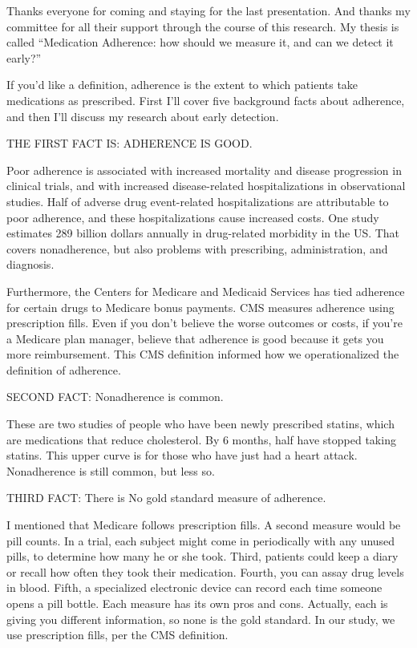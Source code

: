\documentclass[12pt]{report}
\begin{document}
\begin{large}

Thanks everyone for coming and staying for the last presentation. And
thanks my committee for all their support through the course of this
research. My thesis is called ``Medication Adherence: how should we
measure it, and can we detect it early?''

If you'd like a definition, adherence is the extent to which patients
take medications as prescribed. First I'll cover five background facts
about adherence, and then I'll discuss my research about early
detection.

THE FIRST FACT IS: ADHERENCE IS GOOD.

Poor adherence is associated with increased mortality and disease
progression in clinical trials, and with increased disease-related
hospitalizations in observational studies. Half of adverse drug
event-related hospitalizations are attributable to poor adherence, and
these hospitalizations cause increased costs. One study estimates 289
billion dollars annually in drug-related morbidity in the US. That
covers nonadherence, but also problems with prescribing,
administration, and diagnosis.

Furthermore, the Centers for Medicare and Medicaid Services has tied
adherence for certain drugs to Medicare bonus payments. CMS measures
adherence using prescription fills. Even if you don't believe the
worse outcomes or costs, if you're a Medicare plan manager, believe
that adherence is good because it gets you more reimbursement. This
CMS definition informed how we operationalized the definition of
adherence.

SECOND FACT: Nonadherence is common.

These are two studies of people who have been newly prescribed
statins, which are medications that reduce cholesterol. By 6 months,
half have stopped taking statins. This upper curve is for those who
have just had a heart attack. Nonadherence is still common, but less
so.

THIRD FACT: There is No gold standard measure of adherence.

I mentioned that Medicare follows prescription fills. A second measure
would be pill counts. In a trial, each subject might come in
periodically with any unused pills, to determine how many he or she
took. Third, patients could keep a diary or recall how often they took
their medication. Fourth, you can assay drug levels in blood. Fifth, a
specialized electronic device can record each time someone opens a
pill bottle. Each measure has its own pros and cons. Actually, each is
giving you different information, so none is the gold standard. In our
study, we use prescription fills, per the CMS definition.


\end{large}
\end{document}
